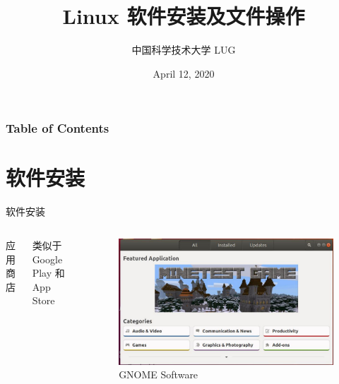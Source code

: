 \documentclass[UTF8]{ctexbeamer}
\title{Linux 软件安装及文件操作}
\author{中国科学技术大学 LUG}
\date{April 12, 2020}
\begin{document}
\frame{\titlepage}
\begin{frame}
	\frametitle{Table of Contents}
	\tableofcontents
\end{frame}



\section{软件安装}
\begin{frame}{软件安装}

    \begin{columns}
    
        
        应用商店
        
        类似于 Google Play 和 App Store
        
        \begin{figure}
            \centering
            \includegraphics[width=\textwidth]{gnome.png}
            \caption{GNOME Software}
        \end{figure}
    \end{columns}
    
\end{frame}
\end{document}

